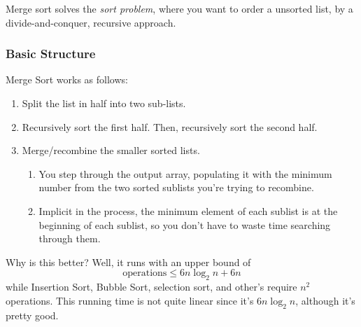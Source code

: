 \documentclass[a4paper,12pt]{scrartcl}
\begin{document}
Merge sort solves the \emph{sort problem}, where you want to 
order a unsorted list, by a divide-and-conquer, recursive
approach.

\subsubsection{Basic Structure}
Merge Sort works as follows:
\begin{enumerate}
    \item Split the list in half into two sub-lists.
    \item Recursively sort the first half. Then, 
	recursively sort the second half.
    \item Merge/recombine the smaller sorted lists.
	\begin{enumerate}
	    \item You step through the output array, 
		populating it with the minimum 
		number from the two sorted sublists you're
		trying to recombine.
	    \item Implicit in the process, the minimum 
		element of each sublist is at the
		beginning of each sublist, so you don't
		have to waste time searching through them.
	\end{enumerate}
\end{enumerate}
Why is this better? Well, it runs with an upper bound
of 
    \[ \text{operations} \leq 6n \log_2 n + 6n \]
while Insertion Sort, Bubble Sort, selection sort, and 
other's require $n^2$ operations. This running time
is not quite linear since it's $6n \log_2 n$, although
it's pretty good.
\end{document}
